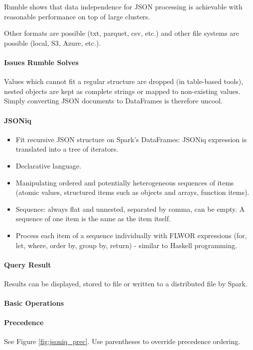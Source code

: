 Rumble shows that data independence for JSON processing is achievable with reasonable performance on top of large clusters.

Other formats are possible (txt, parquet, csv, etc.) and other file systems are possible (local, S3, Azure, etc.).

\paragraph{Issues Rumble Solves}
Values which cannot fit a regular structure are dropped (in table-based tools), nested objects are kept as complete strings or mapped to non-existing values. Simply converting JSON documents to DataFrames is therefore uncool.

\paragraph{JSONiq}
\begin{itemize}
    \item Fit recursive JSON structure on Spark's DataFrames: JSONiq expression is translated into a tree of iterators.
    \item Declarative language.
    \item Manipulating ordered and potentially heterogeneous sequences of items (atomic values, structured items such as objects and arrays, function items).
    \item Sequence: always flat and unnested, separated by comma, can be empty. A sequence of one item is the same as the item itself.
    \item Process each item of a sequence individually with FLWOR expressions (for, let, where, order by, group by, return) - similar to Haskell programming. %
\end{itemize}

\paragraph{Query Result}
Results can be displayed, stored to file or written to a distributed file by Spark.

\paragraph{Basic Operations}



\paragraph{Precedence}
See Figure \ref{fig:jsoniq_prec}. Use parentheses to override precedence ordering.

